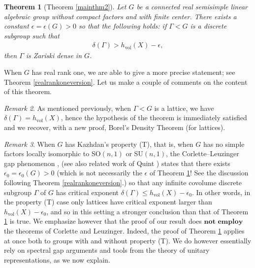 \documentclass[psamsfonts]{amsart}
\newtheorem{thm}{Theorem}[section]
\theoremstyle{definition}
\theoremstyle{remark}
\newtheorem{rem}[thm]{Remark}
\numberwithin{equation}{section}
\begin{document}
\begin{thm} [Theorem \ref{mainthm2}]
\label{mainthm1}
Let $G$ be a connected real semisimple linear algebraic group without compact factors and with finite center. There exists a constant $\epsilon = \epsilon(G) > 0$ so that the following holds: if $\Gamma < G$ is a discrete subgroup such that
\begin{align*}
\delta(\Gamma) > h_{\mathrm{vol}}(X) - \epsilon,
\end{align*} then $\Gamma$ is Zariski dense in $G$.
\end{thm}
When $G$ has real rank one, we are able to give a more precise statement; see Theorem \ref{realrankoneversion}. Let us make a couple of comments on the content of this theorem.
\begin{rem}
As mentioned previously, when $\Gamma < G$ is a lattice, we have $\delta(\Gamma) = h_{\mathrm{vol}}(X)$, hence the hypothesis of the theorem is immediately satisfied and we recover, with a new proof, Borel's Density Theorem (for lattices).
\end{rem}
\begin{rem}
When $G$ has Kazhdan's property (T), that is, when $G$ has no simple factors locally isomorphic to SO$(n,1)$ or SU$(n,1)$, the Corlette--Leuzinger gap phenomenon \cite{Cor}, \cite{Leu} (see also related work of Quint \cite{Q2}) states that there exists $\epsilon_{0} = \epsilon_{0}(G) > 0$ (which is not necessarily the $\epsilon$ of Theorem \ref{mainthm1}! See the discussion following Theorem \ref{realrankoneversion}.) so that any infinite covolume discrete subgroup $\Gamma$ of $G$ has critical exponent $\delta(\Gamma) \leq h_{\mathrm{vol}}(X) - \epsilon_{0}$. In other words, in the property (T) case only lattices have critical exponent larger than $h_{\mathrm{vol}}(X) - \epsilon_{0}$, and so in this setting a stronger conclusion than that of Theorem \ref{mainthm1} is true. We emphasize however that the proof of our result does $\textbf{not employ}$ the theorems of Corlette and Leuzinger. Indeed, the proof of Theorem \ref{mainthm1} applies at once both to groups with and without property (T). We do however essentially rely on spectral gap arguments and tools from the theory of unitary representations, as we now explain.
\end{rem}
\end{document}
